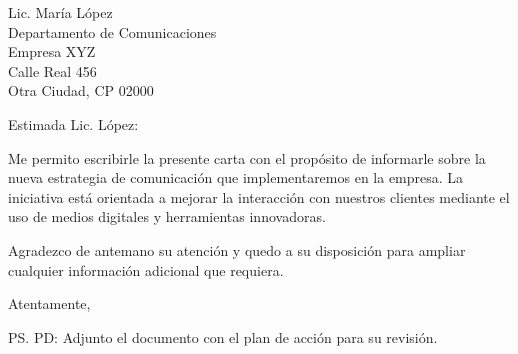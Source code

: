 \documentclass[a4paper,12pt]{letter}
\date{\today}
\begin{document}
	
	\begin{letter}{Lic. María López\\ Departamento de Comunicaciones\\ 
			Empresa XYZ\\ Calle Real 456\\ Otra Ciudad, CP 02000}
		
		\opening{Estimada Lic. López:}
		
		Me permito escribirle la presente carta con el propósito de informarle 
		sobre la nueva estrategia de comunicación que implementaremos en la empresa. 
		La iniciativa está orientada a mejorar la interacción con nuestros clientes 
		mediante el uso de medios digitales y herramientas innovadoras.
		
		Agradezco de antemano su atención y quedo a su disposición para ampliar 
		cualquier información adicional que requiera.
		
		\closing{Atentamente,}
		
		\ps{PD: Adjunto el documento con el plan de acción para su revisión.}
		
		
		
	\end{letter}
	
\end{document}
